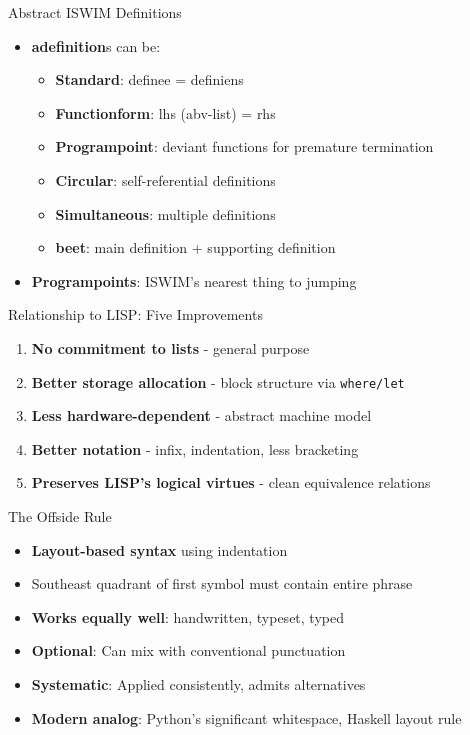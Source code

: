 \documentclass[10pt]{beamer}
\begin{document}
\begin{frame}{Abstract ISWIM Definitions}
\begin{itemize}
\item \textbf{adefinition}s can be:
  \begin{itemize}
  \item \textbf{Standard}: definee = definiens
  \item \textbf{Functionform}: lhs (abv-list) = rhs
  \item \textbf{Programpoint}: deviant functions for premature termination
  \item \textbf{Circular}: self-referential definitions
  \item \textbf{Simultaneous}: multiple definitions
  \item \textbf{beet}: main definition + supporting definition
  \end{itemize}
\item \textbf{Programpoints}: ISWIM's nearest thing to jumping
\end{itemize}
\end{frame}

\begin{frame}{Relationship to LISP: Five Improvements}
\begin{enumerate}
\item \textbf{No commitment to lists} - general purpose
\item \textbf{Better storage allocation} - block structure via \texttt{where/let}
\item \textbf{Less hardware-dependent} - abstract machine model
\item \textbf{Better notation} - infix, indentation, less bracketing
\item \textbf{Preserves LISP's logical virtues} - clean equivalence relations
\end{enumerate}
\end{frame}

\begin{frame}{The Offside Rule}
\begin{itemize}
\item \textbf{Layout-based syntax} using indentation
\item Southeast quadrant of first symbol must contain entire phrase
\item \textbf{Works equally well}: handwritten, typeset, typed
\item \textbf{Optional}: Can mix with conventional punctuation
\item \textbf{Systematic}: Applied consistently, admits alternatives
\item \textbf{Modern analog}: Python's significant whitespace, Haskell layout rule
\end{itemize}
\end{frame}
\end{document}
